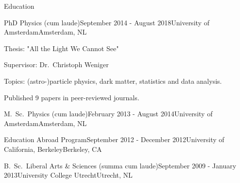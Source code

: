 \documentclass{resume} %
\begin{document}

\begin{rSection}{Education}

\begin{rSubsection}{PhD Physics (cum laude)}{September 2014 - August 2018}{University of Amsterdam}{Amsterdam, NL}
\item Thesis: "All the Light We Cannot See"
\item Supervisor: Dr.~Christoph Weniger
\item Topics: (astro-)particle physics, dark matter, statistics and data analysis.
\item Published 9 papers in peer-reviewed journals.
\end{rSubsection}


\begin{rSubsection}{M.~Sc.~Physics (cum laude)}{February 2013 - August 2014}{University of Amsterdam}{Amsterdam, NL}
\end{rSubsection}


\begin{rSubsection}{Education Abroad Program}{September 2012 - December 2012}{University of California, Berkeley}{Berkeley, CA}
\end{rSubsection}


\begin{rSubsection}{B.~Sc.~Liberal Arts \& Sciences (summa cum laude)}{September 2009 - January 2013}{University College Utrecht}{Utrecht, NL}
\end{rSubsection}
\end{rSection}

\end{document}
